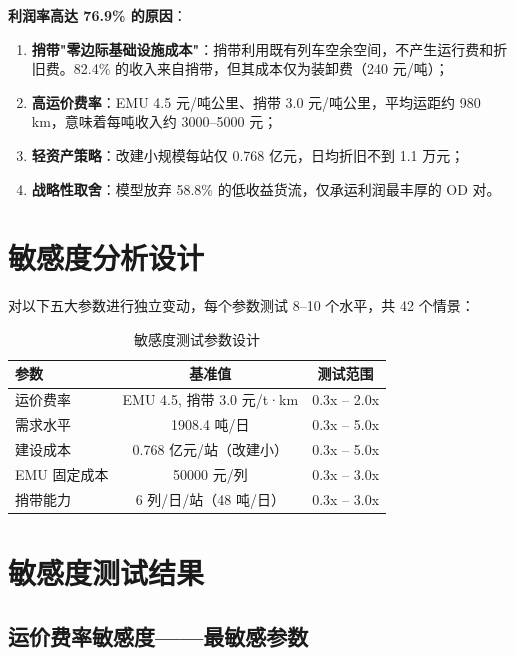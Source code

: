 \documentclass[12pt,a4paper,fontset=none]{ctexart}
\begin{document}
\textbf{利润率高达 76.9\% 的原因}：
\begin{enumerate}
    \item \textbf{捎带"零边际基础设施成本"}：捎带利用既有列车空余空间，不产生运行费和折旧费。82.4\% 的收入来自捎带，但其成本仅为装卸费（240 元/吨）；
    \item \textbf{高运价费率}：EMU 4.5 元/吨公里、捎带 3.0 元/吨公里，平均运距约 980 km，意味着每吨收入约 3000--5000 元；
    \item \textbf{轻资产策略}：改建小规模每站仅 0.768 亿元，日均折旧不到 1.1 万元；
    \item \textbf{战略性取舍}：模型放弃 58.8\% 的低收益货流，仅承运利润最丰厚的 OD 对。
\end{enumerate}

\section{敏感度分析设计}

对以下五大参数进行独立变动，每个参数测试 8--10 个水平，共 42 个情景：

\begin{table}[H]
\centering\caption{敏感度测试参数设计}
\begin{tabular}{lcc}
\toprule
参数 & 基准值 & 测试范围 \\
\midrule
运价费率 & EMU 4.5, 捎带 3.0 元/t·km & 0.3x -- 2.0x \\
需求水平 & 1908.4 吨/日 & 0.3x -- 5.0x \\
建设成本 & 0.768 亿元/站（改建小） & 0.3x -- 5.0x \\
EMU 固定成本 & 50000 元/列 & 0.3x -- 3.0x \\
捎带能力 & 6 列/日/站（48 吨/日） & 0.3x -- 3.0x \\
\bottomrule
\end{tabular}
\end{table}

\section{敏感度测试结果}

\subsection{运价费率敏感度——最敏感参数}
\end{document}
